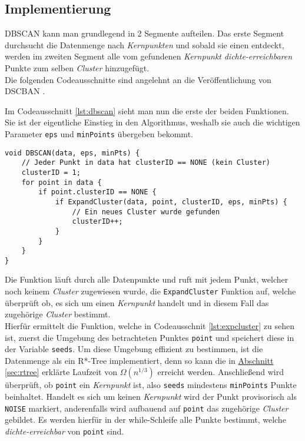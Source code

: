 \documentclass{lni}
\begin{document}
%
%

\subsection{Implementierung}
\label{sec:impl}
DBSCAN kann man grundlegend in 2 Segmente aufteilen. Das erste Segment durchsucht die Datenmenge nach \textit{Kernpunkten} und sobald sie einen entdeckt, werden im zweiten Segment alle vom gefundenen \textit{Kernpunkt} \textit{dichte-erreichbaren} Punkte zum selben \textit{Cluster} hinzugefügt.\\
Die folgenden Codeausschnitte sind angelehnt an die Veröffentlichung von DSCBAN \cite{DBSCAN}.


Im Codeausschnitt \ref{lst:dbscan} sieht man nun die erste der beiden Funktionen. Sie ist der eigentliche Einstieg in den Algorithmus, weshalb sie auch die wichtigen Parameter \lstinline{eps} und \lstinline{minPoints} übergeben bekommt.\\


\begin{lstlisting}[caption={DBSCAN Methode in Anlehnung an \cite{DBSCAN}},label={lst:dbscan}]
void DBSCAN(data, eps, minPts) {
    // Jeder Punkt in data hat clusterID == NONE (kein Cluster)
    clusterID = 1;
    for point in data {
        if point.clusterID == NONE {
            if ExpandCluster(data, point, clusterID, eps, minPts) {
                // Ein neues Cluster wurde gefunden
                clusterID++;
            }
        }
    }
}
\end{lstlisting}


Die Funktion läuft durch alle Datenpunkte und ruft mit jedem Punkt, welcher noch keinem \textit{Cluster} zugewiesen wurde, die \lstinline{ExpandCluster} Funktion auf, welche überprüft ob, es sich um einen \textit{Kernpunkt} handelt und in diesem Fall das zugehörige \textit{Cluster} bestimmt.\\
Hierfür ermittelt die Funktion, welche in Codeausschnit \ref{lst:expcluster} zu sehen ist, zuerst die Umgebung des betrachteten Punktes \lstinline{point} und speichert diese in der Variable \lstinline{seeds}.
Um diese Umgebung effizient zu bestimmen, ist die Datenmenge als ein R*-Tree implementiert, denn so kann die in \hyperref[sec:rtree]{Abschnitt \ref{sec:rtree}} erklärte Laufzeit von $\Omega(n^{1/3})$ erreicht werden. Anschließend wird überprüft, ob \lstinline{point} ein \textit{Kernpunkt} ist, also \lstinline{seeds} mindestens \lstinline{minPoints} Punkte beinhaltet. Handelt es sich um keinen \textit{Kernpunkt} wird der Punkt provisorisch als \lstinline{NOISE} markiert, anderenfalls wird aufbauend auf \lstinline{point} das zugehörige \textit{Cluster} gebildet. Es werden hierfür in der while-Schleife alle Punkte bestimmt, welche \textit{dichte-erreichbar} von \lstinline{point} sind.
\end{document}
